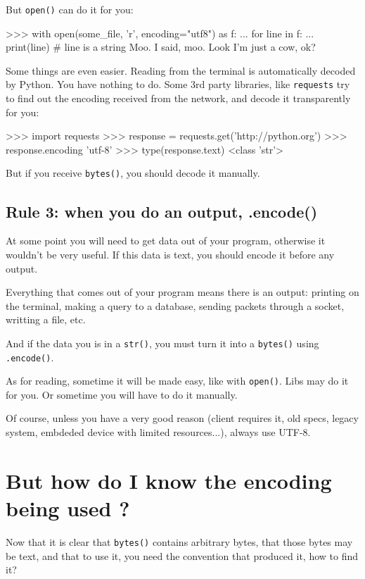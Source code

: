 But \lstinline{open()} can do it for you:

\begin{py3}
>>> with open(some_file, 'r', encoding="utf8") as f:
...     for line in f:
...         print(line) # line is a string
Moo.
I said, moo.
Look I'm just a cow, ok?
\end{py3}

Some things are even easier. Reading from the terminal is automatically decoded by Python. You have nothing to do. Some 3rd party libraries, like \lstinline{requests} try to find out the encoding received from the network, and decode it transparently for you:

\begin{py3}
>>> import requests
>>> response = requests.get('http://python.org')
>>> response.encoding
'utf-8'
>>> type(response.text)
<class 'str'>
\end{py3}

But if you receive \lstinline{bytes()}, you should decode it manually.

\subsection{Rule 3: when you do an output, .encode()}

At some point you will need to get data out of your program, otherwise it wouldn't be very useful. If this data is text, you should encode it before any output.

Everything that comes out of your program means there is an output: printing on the terminal, making a query to a database, sending packets through a socket, writting a file, etc.

And if the data you is in a \lstinline{str()}, you must turn it into a \lstinline{bytes()} using \lstinline{.encode()}.

As for reading, sometime it will be made easy, like with \lstinline{open()}. Libs may do it for you. Or sometime you will have to do it manually.

Of course, unless you have a very good reason (client requires it, old specs, legacy system, embdeded device with limited resources...), always use UTF-8.

\section{But how do I know the encoding being used ?}

Now that it is clear that \lstinline{bytes()} contains arbitrary bytes, that those bytes may be text, and that to use it, you need the convention that produced it, how to find it?


